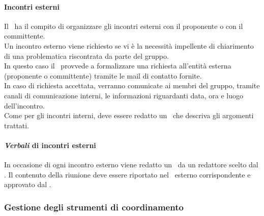       \paragraph{Incontri esterni}
        Il \roleProjectManagerLow\ ha il compito di organizzare gli incontri esterni con il proponente o con il committente.\\
        Un incontro esterno viene richiesto se vi è la necessità impellente di chiarimento di una problematica riscontrata da parte del gruppo.\\
        In questo caso il \roleProjectManagerLow\ provvede a formalizzare una richiesta all’entità esterna (proponente o committente) tramite le mail di contatto fornite.\\
        In caso di richiesta accettata, verranno comunicate ai membri del gruppo, tramite canali di comunicazione interni, le informazioni riguardanti data, ora e luogo dell’incontro.\\
        Come per gli incontri interni, deve essere redatto un \docNameVLow\ che descriva gli argomenti trattati.
      \paragraph {\textit{Verbali} di incontri esterni}
      In occasione di ogni incontro esterno viene redatto un \docNameVLow\ da un redattore scelto dal \roleProjectManagerLow. Il contenuto della riunione deve essere riportato nel \docNameVLow\ esterno corrispondente e approvato dal \roleProjectManagerLow.

    \subsubsection{Gestione degli strumenti di coordinamento}
